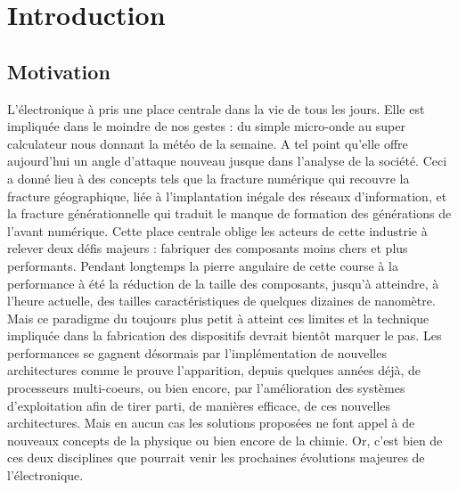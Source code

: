 \chapter*{Introduction}
\setcounter{figure}{0}

\section*{Motivation}
L'électronique à pris une place centrale dans la vie de tous les jours. Elle est impliquée dans le moindre de nos gestes : du simple micro-onde au super calculateur nous donnant la météo de la semaine. A tel point qu'elle offre aujourd'hui un angle d'attaque nouveau jusque dans l'analyse de la société. Ceci a donné lieu à des concepts tels que la fracture numérique qui recouvre la fracture géographique, liée à l'implantation inégale des réseaux d'information, et la fracture générationnelle qui traduit le manque de formation des générations de l'avant numérique. Cette place centrale oblige les acteurs de cette industrie à relever deux défis majeurs : fabriquer des composants moins chers et plus performants. Pendant longtemps la pierre angulaire de cette course à la performance à été la réduction de la taille des composants, jusqu'à atteindre, à l'heure actuelle, des tailles caractéristiques de quelques dizaines de nanomètre. Mais ce paradigme du toujours plus petit à atteint ces limites et la technique impliquée dans la fabrication des dispositifs devrait bientôt marquer le pas. Les performances se gagnent désormais par l'implémentation de nouvelles architectures comme le prouve l'apparition, depuis quelques années déjà, de processeurs multi-coeurs, ou bien encore, par l'amélioration des systèmes d'exploitation afin de tirer parti, de manières efficace, de ces nouvelles architectures. Mais en aucun cas les solutions proposées ne font appel à de nouveaux concepts de la physique ou bien encore de la chimie. Or, c'est bien de ces deux disciplines que pourrait venir les prochaines évolutions majeures de l'électronique.

